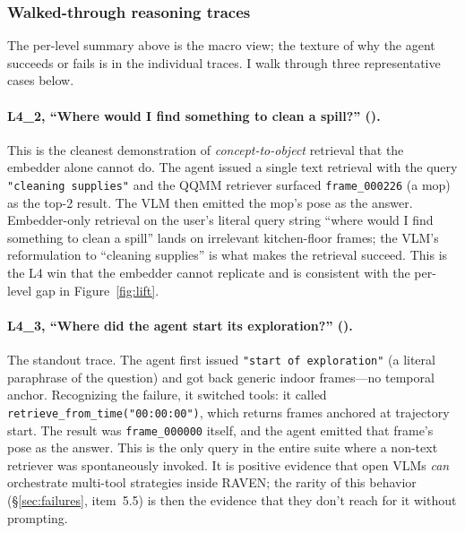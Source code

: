 \documentclass[12pt,letterpaper,oneside]{article}
\begin{document}
\subsubsection*{Walked-through reasoning traces}

The per-level summary above is the macro view; the texture of why the
agent succeeds or fails is in the individual traces.  I walk through
three representative cases below.

\paragraph{L4\_2, ``Where would I find something to clean a spill?'' (\checkmark).}
This is the cleanest demonstration of \emph{concept-to-object}
retrieval that the embedder alone cannot do.  The agent issued a
single text retrieval with the query \texttt{"cleaning supplies"} and
the QQMM retriever surfaced \texttt{frame\_000226} (a mop) as the
top-2 result.  The VLM then emitted the mop's pose as the answer.
Embedder-only retrieval on the user's literal query string ``where
would I find something to clean a spill'' lands on irrelevant
kitchen-floor frames; the VLM's reformulation to ``cleaning supplies''
is what makes the retrieval succeed.  This is the L4 win that the
embedder cannot replicate and is consistent with the per-level gap in
Figure~\ref{fig:lift}.

\paragraph{L4\_3, ``Where did the agent start its exploration?'' (\checkmark).}
The standout trace.  The agent first issued \texttt{"start of
exploration"} (a literal paraphrase of the question) and got back
generic indoor frames---no temporal anchor.  Recognizing the failure,
it switched tools: it called
\texttt{retrieve\_from\_time("00:00:00")}, which returns frames
anchored at trajectory start.  The result was \texttt{frame\_000000}
itself, and the agent emitted that frame's pose as the answer.  This
is the only query in the entire suite where a non-text retriever was
spontaneously invoked.  It is positive evidence that open VLMs
\emph{can} orchestrate multi-tool strategies inside RAVEN; the rarity
of this behavior (\S\ref{sec:failures}, item~5.5) is then the
evidence that they don't reach for it without prompting.
\end{document}
